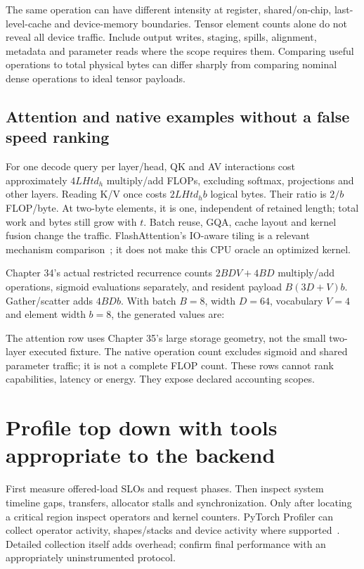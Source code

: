 
The same operation can have different intensity at register, shared/on-chip,
last-level-cache and device-memory boundaries. Tensor element counts alone
do not reveal all device traffic. Include output writes, staging, spills,
alignment, metadata and parameter reads where the scope requires them.
Comparing useful operations to total physical bytes can differ sharply from
comparing nominal dense operations to ideal tensor payloads.

\subsection{Attention and native examples without a false speed ranking}
For one decode query per layer/head, QK and AV interactions cost approximately
$4LHtd_h$ multiply/add FLOPs, excluding softmax, projections and other layers.
Reading K/V once costs $2LHtd_hb$ logical bytes. Their ratio is $2/b$ FLOP/byte.
At two-byte elements, it is one, independent of retained length; total work
and bytes still grow with $t$. Batch reuse, GQA, cache layout and kernel fusion
change the traffic. FlashAttention's IO-aware tiling is a relevant mechanism
comparison~\cite{flash47}; it does not make this CPU oracle an optimized kernel.

Chapter 34's actual restricted recurrence counts $2BDV+4BD$ multiply/add
operations, sigmoid evaluations separately, and resident payload
$B(3D+V)b$. Gather/scatter adds $4BDb$. With batch $B=8$, width $D=64$,
vocabulary $V=4$ and element width $b=8$, the generated values are:
\begin{center}\end{center}
The attention row uses Chapter 35's large storage geometry, not the small
two-layer executed fixture. The native operation count excludes sigmoid and
shared parameter traffic; it is not a complete FLOP count. These rows cannot
rank capabilities, latency or energy. They expose declared accounting scopes.

\section{Profile top down with tools appropriate to the backend}
\label{evod47:backends}
First measure offered-load SLOs and request phases. Then inspect system
timeline gaps, transfers, allocator stalls and synchronization. Only after
locating a critical region inspect operators and kernel counters. PyTorch
Profiler can collect operator activity, shapes/stacks and device activity
where supported~\cite{torch47}. Detailed collection itself adds overhead;
confirm final performance with an appropriately uninstrumented protocol.

